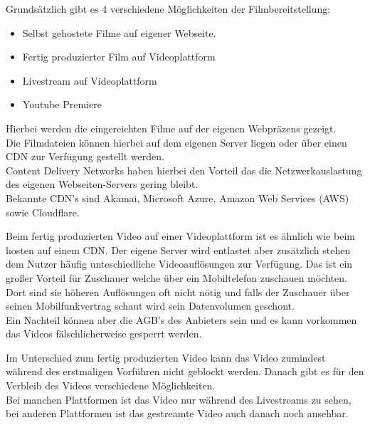 \newpage
{}

Grundsätzlich gibt es 4 verschiedene Möglichkeiten der Filmbereitstellung: \\

\begin{itemize}
  \item Selbst gehostete Filme auf eigener Webseite.
  \item Fertig produzierter Film auf Videoplattform
  \item Livestream auf Videoplattform
  \item Youtube Premiere
\end{itemize}
{\vspace{-0.7cm}}

Hierbei werden die eingereichten Filme auf der eigenen Webpräzens gezeigt.\\
Die Filmdateien können hierbei auf dem eigenen Server liegen oder über einen CDN zur Verfügung gestellt werden. \\
Content Delivery Networks haben hierbei den Vorteil das die Netzwerkauslastung des eigenen Webseiten-Servers gering bleibt. \\

Bekannte CDN's sind Akamai, Microsoft Azure, Amazon Web Services (AWS) sowie Cloudflare.


Beim fertig produzierten Video auf einer Videoplattform ist es ähnlich wie beim hosten auf einem CDN. Der eigene Server wird entlastet aber zusätzlich stehen dem Nutzer häufig unteschiedliche Videoauflösungen zur Verfügung. Das ist ein großer Vorteil für Zuschauer welche über ein Mobiltelefon zuschauen möchten. Dort sind sie höheren Auflösungen oft nicht nötig und falls der Zuschauer über seinen Mobilfunkvertrag schaut wird sein Datenvolumen geschont. \\
Ein Nachteil können aber die AGB's des Anbieters sein und es kann vorkommen das Videos fälschlicherweise gesperrt werden.

Im Unterschied zum fertig produzierten Video kann das Video zumindest während des erstmaligen Vorführen nicht geblockt werden.
Danach gibt es für den Verbleib des Videos verschiedene Möglichkeiten. \\
Bei manchen Plattformen ist das Video nur während des Livestreams zu sehen, bei anderen Plattformen ist das gestreamte Video auch danach noch ansehbar.\\

